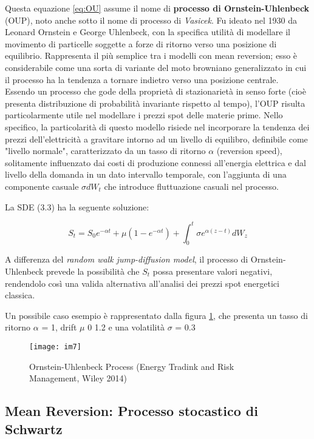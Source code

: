 \documentclass[12pt,a4paper]{report}
\begin{document}
Questa equazione \eqref{eq:OU} assume il nome di \textbf{processo di Ornstein-Uhlenbeck} (OUP),  noto anche sotto il nome di processo di \textit{Vasicek}. Fu ideato nel 1930 da Leonard Ornstein e George Uhlenbeck, con la specifica utilità di modellare il movimento di particelle soggette a forze di ritorno verso una posizione di equilibrio. Rappresenta il più semplice tra i modelli con mean reversion; esso è considerabile come una sorta di variante del moto browniano generalizzato in cui il processo ha la tendenza a tornare indietro verso una posizione centrale.
Essendo un processo che gode della proprietà di stazionarietà in senso forte (cioè presenta distribuzione di probabilità invariante rispetto al tempo), l'OUP risulta particolarmente utile nel modellare i prezzi spot delle materie prime.
Nello specifico, la particolarità di questo modello risiede nel incorporare la tendenza dei prezzi dell'elettricità a gravitare intorno ad un livello di equilibro, definibile come "livello normale", caratterizzato da un tasso di ritorno $\alpha$ (reversion speed), solitamente influenzato dai costi di produzione connessi all'energia elettrica e dal livello della domanda in un dato intervallo temporale, con l'aggiunta di una componente casuale $\sigma dW_t$ che introduce fluttuazione casuali nel processo.

La SDE (3.3) ha la seguente soluzione:

\begin{equation}
    S_t = S_0e^{-\alpha t} + \mu(1-e^{-\alpha t}) + \int_{0}^{t} \sigma e^{\alpha(z - t)} dW_z
\end{equation} 

A differenza del \textit{random walk jump-diffusion model}, il processo di Ornstein-Uhlenbeck prevede la possibilità che $S_t$ possa presentare valori negativi, rendendolo così una valida alternativa all'analisi dei prezzi spot energetici classica.

Un possibile caso esempio è rappresentato dalla figura \ref{fig:enter-label3}, che presenta un tasso di ritorno $\alpha$ = 1, drift $\mu$ 0 1.2 e una volatilità $\sigma$ = 0.3

\begin{figure}
     [ht]
    \centering
    \texttt{[image: im7]}
    \caption{Ornstein-Uhlenbeck Process (Energy Tradink and Risk Management, Wiley 2014)}
    \label{fig:enter-label3}
\end{figure}



\subsection{Mean Reversion: Processo stocastico di Schwartz}
\end{document}
